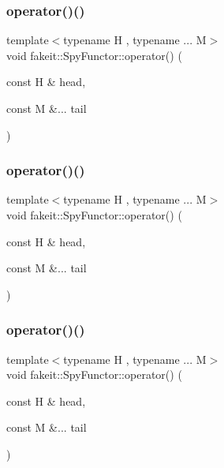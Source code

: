 \mbox{\label{classfakeit_1_1SpyFunctor_aaac87a66aafadbf0ef8859114546ff9f}} 
\subsubsection{\texorpdfstring{operator()()}{operator()()}\hspace{0.1cm}{\footnotesize\ttfamily [6/9]}}
{\footnotesize\ttfamily template$<$typename H , typename ... M$>$ \\
void fakeit\+::\+Spy\+Functor\+::operator() (\begin{DoxyParamCaption}\item[{const H \&}]{head,  }\item[{const M \&...}]{tail }\end{DoxyParamCaption})\hspace{0.3cm}{\ttfamily [inline]}}

\mbox{\label{classfakeit_1_1SpyFunctor_aaac87a66aafadbf0ef8859114546ff9f}} 
\subsubsection{\texorpdfstring{operator()()}{operator()()}\hspace{0.1cm}{\footnotesize\ttfamily [7/9]}}
{\footnotesize\ttfamily template$<$typename H , typename ... M$>$ \\
void fakeit\+::\+Spy\+Functor\+::operator() (\begin{DoxyParamCaption}\item[{const H \&}]{head,  }\item[{const M \&...}]{tail }\end{DoxyParamCaption})\hspace{0.3cm}{\ttfamily [inline]}}

\mbox{\label{classfakeit_1_1SpyFunctor_aaac87a66aafadbf0ef8859114546ff9f}} 
\subsubsection{\texorpdfstring{operator()()}{operator()()}\hspace{0.1cm}{\footnotesize\ttfamily [8/9]}}
{\footnotesize\ttfamily template$<$typename H , typename ... M$>$ \\
void fakeit\+::\+Spy\+Functor\+::operator() (\begin{DoxyParamCaption}\item[{const H \&}]{head,  }\item[{const M \&...}]{tail }\end{DoxyParamCaption})\hspace{0.3cm}{\ttfamily [inline]}}


